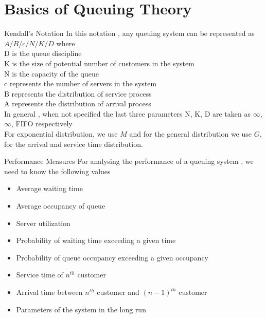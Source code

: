 \documentclass[9pt]{beamer}
\begin{document}
\section{Basics of Queuing Theory}
\begin{frame}{Kendall's Notation}
In this notation , any queuing system can be represented as $A/B/c/N/K/D$ where 
\\ D is the queue discipline
\\ K is the size of potential number of customers in the system
\\ N is the capacity of the queue
\\ c represents the number of servers in the system 
\\ B represents the distribution of service process
\\ A represents the distribution of arrival process
\\ In general , when not specified the last three parameters N, K, D are taken as $\infty$, $\infty$, FIFO respectively
\\ For exponential distribution, we use $M$ and for the general distribution we use $G$, for the arrival and service time distribution.
\end{frame}
\begin{frame}{Performance Measures}
For analysing the performance of a queuing system , we need to know the following values
\begin{itemize}
    \item Average waiting time
    \item Average occupancy of queue
    \item Server utilization
    \item Probability of waiting time exceeding a given time
    \item Probability of queue occupancy exceeding a given occupancy
    \item Service time of $n^{th}$ customer
    \item Arrival time between $n^{th}$ customer and $(n-1)^{th}$ customer
    \item Parameters of the system in the long run
\end{itemize}
    
\end{frame}
\end{document}

